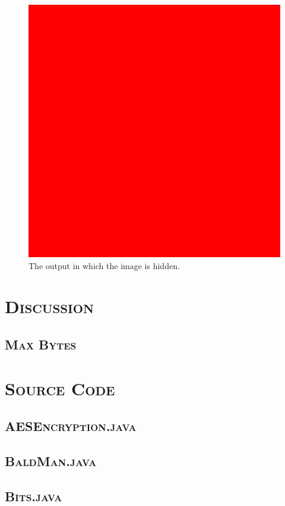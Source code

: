 \documentclass[12pt]{article}
\begin{document}
	\begin{figure}[h!]
		\centering
		\includegraphics[keepaspectratio=true, width=0.3\linewidth]{image/newRed.png}
		\caption{The output in which the image is hidden.}
	\end{figure}
	
	\section[Discussion]{\Large{}\selectfont\scshape Discussion}
	
	\subsection[Max Bytes]{\hspace*{1em}\large{}\selectfont\scshape Max Bytes}
	
	\section[Source Code]{\Large{}\selectfont\scshape Source Code}
	
	\subsection[AESEncryption]{\hspace*{1em}\large{}\selectfont\scshape AESEncryption.java}
	
	
	\subsection[BaldMan]{\hspace*{1em}\large{}\selectfont\scshape BaldMan.java}
	
	
	\subsection[Bits]{\hspace*{1em}\large{}\selectfont\scshape Bits.java}
	
	
\end{document}
